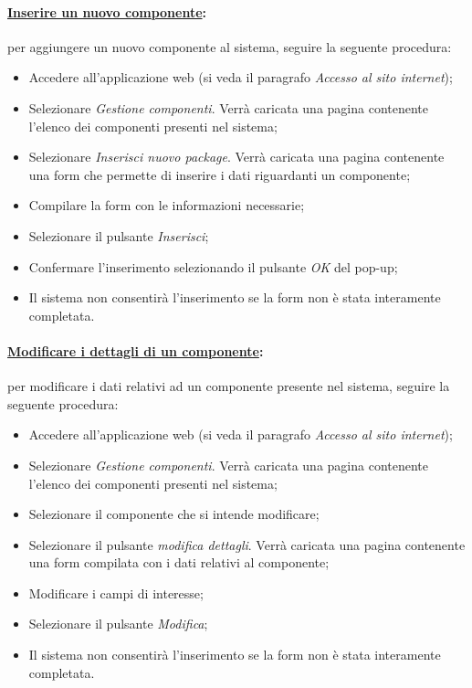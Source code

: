 \paragraph{\underline{Inserire un nuovo componente}:}
per aggiungere un nuovo componente al sistema, seguire la seguente procedura:
\begin{itemize}
\item Accedere all'applicazione web (si veda il paragrafo \textit{Accesso al sito internet});
\item Selezionare \textit{Gestione componenti}. Verrà caricata una pagina contenente l'elenco dei componenti presenti nel sistema;
\item Selezionare \textit{Inserisci nuovo package}. Verrà caricata una pagina contenente una form che permette di inserire i dati riguardanti un componente;
\item Compilare la form con le informazioni necessarie;
\item Selezionare il pulsante \textit{Inserisci};
\item Confermare l'inserimento selezionando il pulsante \textit{OK} del pop-up;
\item Il sistema non consentirà l'inserimento se la form non è stata interamente completata.
\end{itemize}

\paragraph{\underline{Modificare i dettagli di un componente}:}
per modificare i dati relativi ad un componente presente nel sistema, seguire la seguente procedura:
\begin{itemize}
\item Accedere all'applicazione web (si veda il paragrafo \textit{Accesso al sito internet});
\item Selezionare \textit{Gestione componenti}. Verrà caricata una pagina contenente l'elenco dei componenti presenti nel sistema;
\item Selezionare il componente che si intende modificare;
\item Selezionare il pulsante \textit{modifica dettagli}. Verrà caricata una pagina contenente una form compilata con i dati relativi al componente;
\item Modificare i campi di interesse;
\item Selezionare il pulsante \textit{Modifica};
\item Il sistema non consentirà l'inserimento se la form non è stata interamente completata.
\end{itemize}

